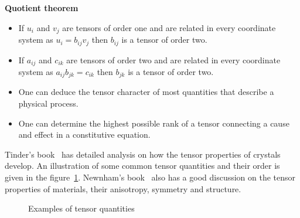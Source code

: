 {\bf Quotient theorem}

\begin{itemize}
\item If $u_i$ and $v_j$ are tensors of order one and are related in every coordinate system as $u_i = b_{ij} v_j$ then $b_{ij}$ is a tensor of order two.

\item If $a_{ij}$ and $c_{ik}$ are tensors of order two and are related in every coordinate system as $a_{ij} b_{jk} = c_{ik}$ then $b_{jk}$ is a tensor of order two.

\item One can deduce the tensor character of most quantities that describe a physical process.

\item One can determine the highest possible rank of a tensor connecting a cause and effect in a constitutive equation.

\end{itemize}


Tinder's book~\cite{tinder} has detailed analysis on how the tensor properties of crystals develop. An illustration of some common tensor quantities and their order is given in the figure~\ref{tensorexamples}. Newnham's book~\cite{newnham} also has a good discussion on the tensor properties of materials, their anisotropy, symmetry and structure.

\begin{figure}[h]
\begin{center}
\end{center}
\caption{Examples of tensor quantities}
\label{tensorexamples}
\end{figure}

